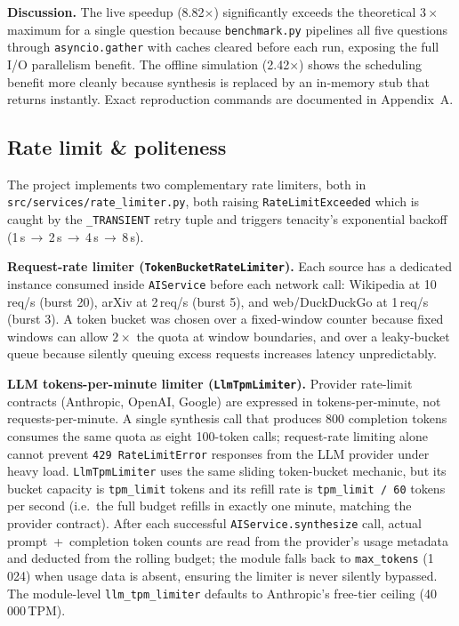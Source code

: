 \documentclass[11pt,a4paper]{article}
\begin{document}
\textbf{Discussion.}
The live speedup (8.82$\times$) significantly exceeds the theoretical $3\times$ maximum
for a single question because \texttt{benchmark.py} pipelines all five questions
through \texttt{asyncio.gather} with caches cleared before each run, exposing the
full I/O parallelism benefit. The offline simulation (2.42$\times$) shows the
scheduling benefit more cleanly because synthesis is replaced by an in-memory stub
that returns instantly. Exact reproduction commands are documented in Appendix~A.

\subsection{Rate limit \& politeness}

The project implements two complementary rate limiters, both in
\texttt{src/services/rate\_limiter.py}, both raising \texttt{RateLimitExceeded}
which is caught by the \texttt{\_TRANSIENT} retry tuple and triggers tenacity's
exponential backoff (1\,s\,$\to$\,2\,s\,$\to$\,4\,s\,$\to$\,8\,s).

\textbf{Request-rate limiter (\texttt{TokenBucketRateLimiter}).}
Each source has a dedicated instance consumed inside \texttt{AIService} before
each network call: Wikipedia at 10\,req/s (burst 20), arXiv at 2\,req/s (burst 5),
and web/DuckDuckGo at 1\,req/s (burst 3). A token bucket was chosen over a
fixed-window counter because fixed windows can allow $2\times$ the quota at window
boundaries, and over a leaky-bucket queue because silently queuing excess requests
increases latency unpredictably.

\textbf{LLM tokens-per-minute limiter (\texttt{LlmTpmLimiter}).}
Provider rate-limit contracts (Anthropic, OpenAI, Google) are expressed in
tokens-per-minute, not requests-per-minute. A single synthesis call that produces
800 completion tokens consumes the same quota as eight 100-token calls; request-rate
limiting alone cannot prevent \texttt{429 RateLimitError} responses from the LLM
provider under heavy load. \texttt{LlmTpmLimiter} uses the same sliding token-bucket
mechanic, but its bucket capacity is \texttt{tpm\_limit} tokens and its refill rate
is \texttt{tpm\_limit / 60} tokens per second (i.e.~the full budget refills in exactly
one minute, matching the provider contract). After each successful
\texttt{AIService.synthesize} call, actual prompt~+~completion token counts are read
from the provider's usage metadata and deducted from the rolling budget; the module
falls back to \texttt{max\_tokens} (1\,024) when usage data is absent, ensuring the
limiter is never silently bypassed. The module-level \texttt{llm\_tpm\_limiter}
defaults to Anthropic's free-tier ceiling (40\,000\,TPM).
\end{document}
